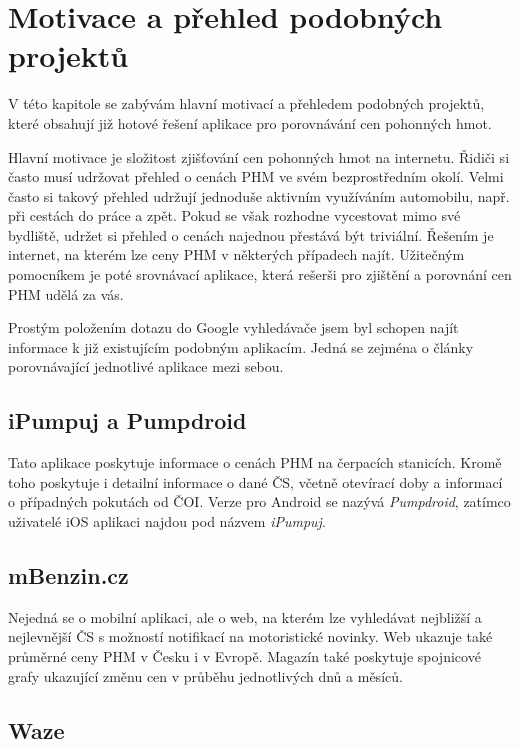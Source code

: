 \chapter{Motivace a přehled podobných projektů}
\label{ch:motivation-and-similar-applications}

V této kapitole se zabývám hlavní motivací a přehledem podobných projektů,
které obsahují již hotové řešení aplikace pro porovnávání cen pohonných hmot.

Hlavní motivace je složitost zjišťování cen pohonných hmot na internetu.
Řidiči si často musí udržovat přehled o cenách PHM ve svém bezprostředním
okolí. Velmi často si takový přehled udržují jednoduše aktivním využíváním
automobilu, např. při cestách do práce a zpět. Pokud se však rozhodne
vycestovat mimo své bydliště, udržet si přehled o cenách najednou přestává
být triviální. Řešením je internet, na kterém lze ceny PHM v některých
případech najít. Užitečným pomocníkem je poté srovnávací aplikace, která
rešerši pro zjištění a porovnání cen PHM udělá za vás.

Prostým položením dotazu do Google vyhledávače jsem byl schopen najít
informace k již existujícím podobným aplikacím. Jedná se zejména o články
porovnávající jednotlivé aplikace mezi sebou.

\section{iPumpuj a Pumpdroid}
\label{sec:ipumpuj-pumpdroid}

Tato aplikace poskytuje informace o cenách PHM na čerpacích stanicích.
Kromě toho poskytuje i detailní informace o dané ČS, včetně otevírací
doby a informací o případných pokutách od ČOI. Verze pro Android
se nazývá \emph{Pumpdroid}, zatímco uživatelé iOS aplikaci najdou
pod názvem \emph{iPumpuj}.
\cite{Vrablova2022, Sarikova2021}

\section{mBenzin.cz}
\label{sec:mbenzin}

Nejedná se o mobilní aplikaci, ale o web, na kterém lze vyhledávat
nejbližší a nejlevnější ČS s možností notifikací na motoristické
novinky. Web ukazuje také průměrné ceny PHM v Česku i v Evropě.
Magazín také poskytuje spojnicové grafy ukazující změnu cen
v průběhu jednotlivých dnů a měsíců.
\cite{Vrablova2022}

\section{Waze}
\label{sec:waze}

